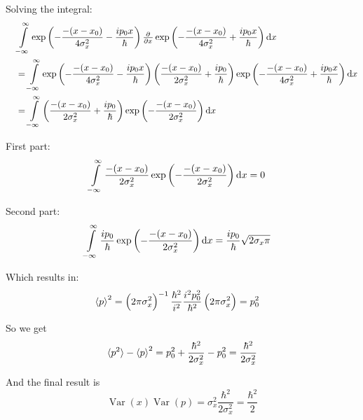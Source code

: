 \documentclass[a4paper,german,12pt,smallheadings]{scrartcl}
\DeclareMathOperator{\Var}{Var}
\begin{document}
\begin{enumerate}[a)]
    Solving the integral:
    \begin{align*}
      \quad&\int\limits_{-\infty}^\infty
      \exp\del{-\frac{-(x-x_0)}{4\sigma_x^2} - \frac{ip_0x}{\hbar}}
      \pd{}{x}
      \exp\del{-\frac{-(x-x_0)}{4\sigma_x^2} + \frac{ip_0x}{\hbar}}
      \dif x \\
      &=
      \int\limits_{-\infty}^\infty
      \exp\del{-\frac{-(x-x_0)}{4\sigma_x^2} - \frac{ip_0x}{\hbar}}
      \del{\frac{-(x-x_0)}{2\sigma_x^2} + \frac{ip_0}{\hbar}}
      \exp\del{-\frac{-(x-x_0)}{4\sigma_x^2} + \frac{ip_0x}{\hbar}}
      \dif x \\
      &=
      \int\limits_{-\infty}^\infty
      \del{\frac{-(x-x_0)}{2\sigma_x^2} + \frac{ip_0}{\hbar}}
      \exp\del{-\frac{-(x-x_0)}{2\sigma_x^2}}
      \dif x \\
    \end{align*}

    First part:
    \begin{align*}
      \int\limits_{-\infty}^\infty
      \frac{-(x-x_0)}{2\sigma_x^2}
      \exp\del{-\frac{-(x-x_0)}{2\sigma_x^2}}
      \dif x
      &= 0
    \end{align*}

    Second part:
    \begin{align*}
      \int\limits_{-\infty}^\infty
      \frac{ip_0}{\hbar}
      \exp\del{-\frac{-(x-x_0)}{2\sigma_x^2}}
      \dif x
      &= \frac{ip_0}{\hbar} \sqrt{2\sigma_x \pi}
    \end{align*}

    Which results in:
    \begin{align*}
      \braket{p}^2 &= \del{2 \pi \sigma_x^2}^{-1} \frac{\hbar^2}{i^2} \frac{i^2p_0^2}{\hbar^2} \del{2 \pi \sigma_x^2}
                   = p_0^2
    \end{align*}

    So we get
    \begin{align*}
      \braket{p^2} - \braket{p}^2 = p_0^2 + \frac{\hbar^2}{2\sigma_x^2} - p_0^2 = \frac{\hbar^2}{2\sigma_x^2}
    \end{align*}

    And the final result is
    \begin{equation*}
      \Var(x)\Var(p) = \sigma_x^2 \frac{\hbar^2}{2 \sigma_x^2} = \frac{\hbar^2}{2}
    \end{equation*}


\end{enumerate}
\end{document}
